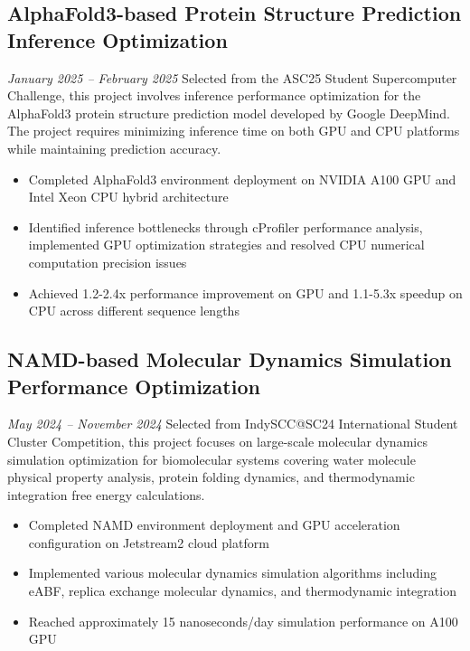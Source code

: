\documentclass{resume}
\begin{document}
\subsection{\textbf{AlphaFold3-based Protein Structure Prediction Inference Optimization}}
\textit{January 2025 -- February 2025}
Selected from the ASC25 Student Supercomputer Challenge, this project involves inference performance optimization for the AlphaFold3 protein structure prediction model developed by Google DeepMind. The project requires minimizing inference time on both GPU and CPU platforms while maintaining prediction accuracy.
\begin{itemize}
  \item Completed AlphaFold3 environment deployment on NVIDIA A100 GPU and Intel Xeon CPU hybrid architecture
  \item Identified inference bottlenecks through cProfiler performance analysis, implemented GPU optimization strategies and resolved CPU numerical computation precision issues
  \item Achieved 1.2-2.4x performance improvement on GPU and 1.1-5.3x speedup on CPU across different sequence lengths
\end{itemize}

\subsection{\textbf{NAMD-based Molecular Dynamics Simulation Performance Optimization}}
\textit{May 2024 -- November 2024}
Selected from IndySCC@SC24 International Student Cluster Competition, this project focuses on large-scale molecular dynamics simulation optimization for biomolecular systems covering water molecule physical property analysis, protein folding dynamics, and thermodynamic integration free energy calculations.
\begin{itemize}
  \item Completed NAMD environment deployment and GPU acceleration configuration on Jetstream2 cloud platform
  \item Implemented various molecular dynamics simulation algorithms including eABF, replica exchange molecular dynamics, and thermodynamic integration
  \item Reached approximately 15 nanoseconds/day simulation performance on A100 GPU
\end{itemize}
\end{document}
